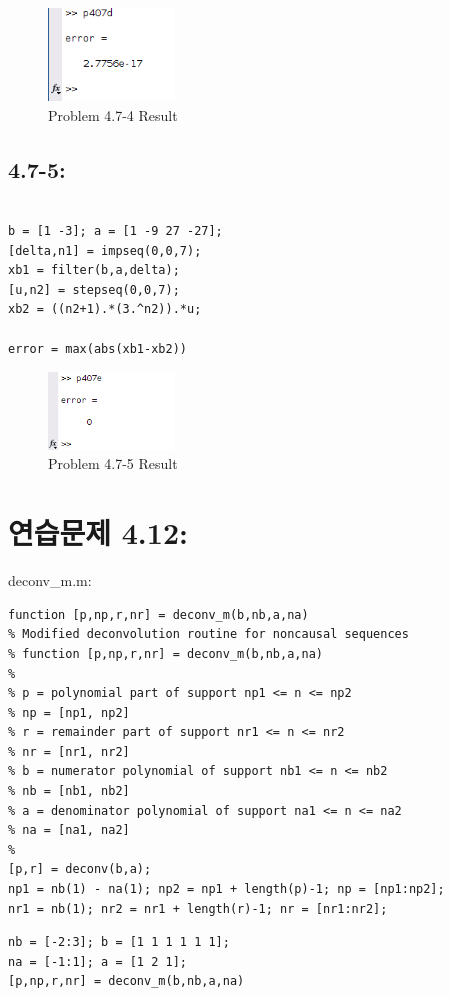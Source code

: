 \documentclass[11pt
  , a4paper
  , article
  , oneside
]{memoir}
\begin{document}
\begin{figure}[h!]
	\centering
	\includegraphics[width=0.3\textwidth,height=0.1\textwidth]{./images/p407d.png}
	\caption{Problem 4.7-4 Result}
	\label{fig:Problem 4.7-4 Result}
\end{figure}

\section{4.7-5: }
\begin{lstlisting}[style=termstyle]
%Problem 4.7-5

b = [1 -3]; a = [1 -9 27 -27]; 
[delta,n1] = impseq(0,0,7);
xb1 = filter(b,a,delta);
[u,n2] = stepseq(0,0,7); 
xb2 = ((n2+1).*(3.^n2)).*u;

error = max(abs(xb1-xb2))
\end{lstlisting}

\begin{figure}[h!]
	\centering
	\includegraphics[width=0.3\textwidth,height=0.1\textwidth]{./images/p407e.png}
	\caption{Problem 4.7-5 Result}
	\label{fig:Problem 4.7-5 Result}
\end{figure}

\chapter{연습문제 4.12: }
deconv\_m.m:
\begin{lstlisting}[style=termstyle]
function [p,np,r,nr] = deconv_m(b,nb,a,na)
% Modified deconvolution routine for noncausal sequences
% function [p,np,r,nr] = deconv_m(b,nb,a,na)
%
% p = polynomial part of support np1 <= n <= np2
% np = [np1, np2]
% r = remainder part of support nr1 <= n <= nr2
% nr = [nr1, nr2]
% b = numerator polynomial of support nb1 <= n <= nb2
% nb = [nb1, nb2]
% a = denominator polynomial of support na1 <= n <= na2
% na = [na1, na2]
%
[p,r] = deconv(b,a);
np1 = nb(1) - na(1); np2 = np1 + length(p)-1; np = [np1:np2];
nr1 = nb(1); nr2 = nr1 + length(r)-1; nr = [nr1:nr2];
\end{lstlisting}

\begin{lstlisting}[style=termstyle]
% Problem 4.10
nb = [-2:3]; b = [1 1 1 1 1 1]; 
na = [-1:1]; a = [1 2 1];
[p,np,r,nr] = deconv_m(b,nb,a,na)
\end{lstlisting}
\end{document}
